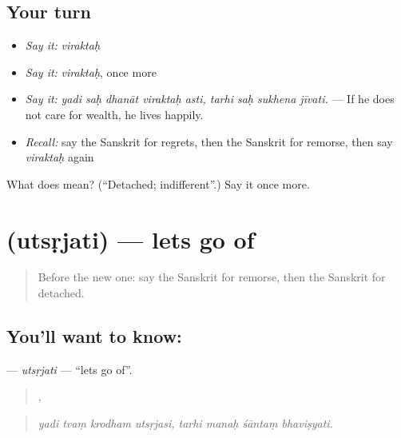 \subsection*{Your turn}
\begin{itemize}
\raggedright
  \item \emph{Say it:} \emph{viraktaḥ}
  \item \emph{Say it:} \emph{viraktaḥ}, once more
  \item \emph{Say it:} \emph{yadi saḥ dhanāt viraktaḥ asti, tarhi saḥ sukhena jīvati.} — If he does not care for wealth, he lives happily.
  \item \emph{Recall:} say the Sanskrit for regrets, then the Sanskrit for remorse, then say \emph{viraktaḥ} again
\end{itemize}

\begin{tcolorbox}[breakable,colback=teal!4,colframe=teal!35!black,title={Before you move on}]
What does  mean? (\textquotedblleft{}Detached; indifferent\textquotedblright{}.) Say it once more.
\end{tcolorbox}
\section[\texorpdfstring{\sk{उत्सृजति} (utsṛjati)}{उत्सृजति (utsṛjati)}]{ (utsṛjati) — lets go of}

\label{lesson:SA-C551-utsrjati}



\begin{quote}
Before the new one: say the Sanskrit for remorse, then the Sanskrit for detached.
\end{quote}

\subsection*{You'll want to know: }
\textbf{} — \emph{utsṛjati} — \textquotedblleft{}lets go of\textquotedblright{}.

\begin{quote}
   ,    
\end{quote}

\begin{quote}
\emph{yadi tvaṃ krodham utsṛjasi, tarhi manaḥ śāntaṃ bhaviṣyati.}
\end{quote}

